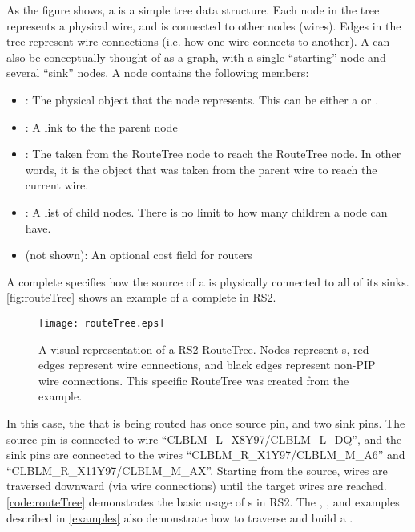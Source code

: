 \noindent
As the figure shows, a  is a simple tree data structure. Each
node in the tree represents a physical wire, and is connected to other nodes
(wires). Edges in the tree represent wire connections (i.e. how one wire
connects to another). A  can also be conceptually thought of as
a graph, with a single ``starting'' node and several ``sink'' nodes. A
 node contains the following members:

\begin{itemize}
  \item {}: The physical  object that the  node
  represents. This can be either a  or .
  \item {}: A link to the the parent  node 
  \item {}: The  taken from the 
  RouteTree node to reach the  RouteTree node. In other words, it
  is the  object that was taken from the parent wire to reach the current wire.
  \item {}: A list of child nodes. There is no limit
  to how many children a  node can have.
  \item {} (not shown): An optional cost field for routers 
\end{itemize}

\noindent
A complete  specifies how the source of a
\cellnet is physically connected to all of its sinks. \autoref{fig:routeTree}
shows an example of a complete  in RS2. 

\begin{figure}[H]
\centering
\texttt{[image: routeTree.eps]}
\caption{A visual representation of a RS2 RouteTree. Nodes represent
s, red edges represent  wire connections, and black edges
represent non-PIP wire connections. This specific RouteTree was created from
the  example.}
\label{fig:routeTree}
\end{figure}

\noindent
In this case, the \cellnet that is being routed has once source pin, and two
sink pins. The source pin is connected to wire ``CLBLM\_L\_X8Y97/CLBLM\_L\_DQ'',
and the sink pins are connected to the wires ``CLBLM\_R\_X1Y97/CLBLM\-\_M\_A6''
and ``CLBLM\-\_R\_X11Y97/CLBLM\_M\_AX''. Starting from the source, wires are
traversed downward (via wire connections) until the target wires are reached.
\autoref{code:routeTree} demonstrates the basic usage of s in
RS2. The , , and 
examples described in \autoref{examples} also demonstrate how to traverse and
build a .

